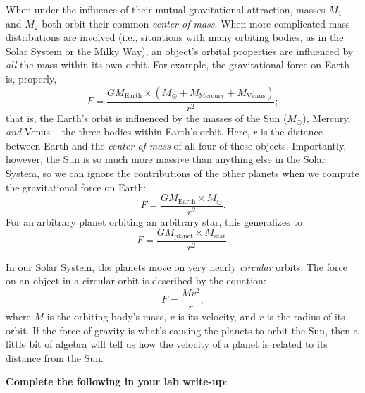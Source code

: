 \documentclass[11pt]{article}%
\begin{document}
When under the influence of their mutual gravitational attraction, masses $M_1$ and $M_2$ both orbit their common \emph{center of mass}. When more complicated mass distributions are involved (i.e., situations with many orbiting bodies, as in the Solar System or the Milky Way), an object's orbital properties are influenced by  \emph{all} the mass within its own orbit. For example, the gravitational force on Earth is, properly,
\begin{equation}
F = \frac{G M_{\textrm{Earth}} \times (M_{\odot} + M_{\textrm{Mercury}} + M_{\textrm{Venus}})}{r^2};
\end{equation}
that is, the Earth's orbit is influenced by the masses of the Sun ($M_\odot$), Mercury, \emph{and} Venus -- the three bodies within Earth's orbit. Here, $r$ is the distance between Earth and the \emph{center of mass} of all four of these objects. Importantly, however, the Sun is so much more massive than anything else in the Solar System, so we can ignore the contributions of the other planets when we compute the gravitational force on Earth:
\begin{equation}
F = \frac{G M_{\textrm{Earth}} \times M_{\odot}}{r^2}.
\end{equation}
For an arbitrary planet orbiting an arbitrary star, this generalizes to
\begin{equation} \label{eq:grav}
F = \frac{G M_{\textrm{planet}} \times M_{\textrm{star}}}{r^2}.
\end{equation}

In our Solar System, the planets move on very nearly \emph{circular} orbits. The force on an object in a circular orbit is described by the equation:
\begin{equation} \label{eq:CF}
F = \frac{M v^2}{r},
\end{equation}
where $M$ is the orbiting body's mass, $v$ is its velocity, and $r$ is the radius of its orbit. If the force of gravity is what's causing the planets to orbit the Sun, then a little bit of algebra will tell us how the velocity of a planet is related to its distance from the Sun.

\textbf{Complete the following in your lab write-up}:
\end{document}
